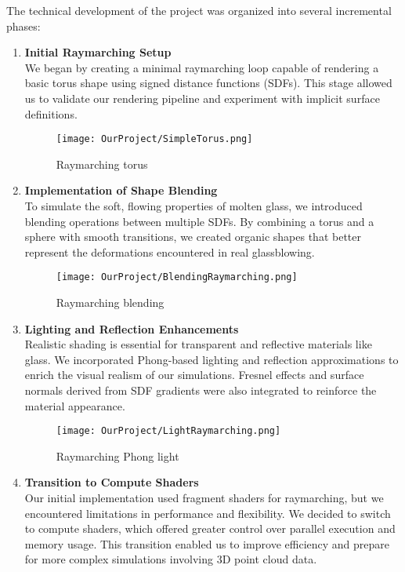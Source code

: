\documentclass{rapportcs}
\begin{document}
The technical development of the project was organized into several incremental phases:
\begin{enumerate}
  \item \textbf{Initial Raymarching Setup}\\
    We began by creating a minimal raymarching loop capable of rendering a basic torus shape using signed distance functions (SDFs). This stage allowed us to validate our rendering pipeline and experiment with implicit surface definitions.

    \begin{figure}[H]
    \centering
    \texttt{[image: OurProject/SimpleTorus.png]}
    \caption{Raymarching torus}
    \label{fig:label_image}
\end{figure}
\newpage
    
  \item \textbf{Implementation of Shape Blending}\\
    To simulate the soft, flowing properties of molten glass, we introduced blending operations between multiple SDFs. By combining a torus and a sphere with smooth transitions, we created organic shapes that better represent the deformations encountered in real glassblowing.

    \begin{figure}[H]
    \centering
    \texttt{[image: OurProject/BlendingRaymarching.png]}
    \caption{Raymarching blending}
    \label{fig:label_image}
\end{figure}

\newpage
    
  \item \textbf{Lighting and Reflection Enhancements}\\
    Realistic shading is essential for transparent and reflective materials like glass. We incorporated Phong-based lighting and reflection approximations to enrich the visual realism of our simulations. Fresnel effects and surface normals derived from SDF gradients were also integrated to reinforce the material appearance.

    \begin{figure}[H]
    \centering
    \texttt{[image: OurProject/LightRaymarching.png]}
    \caption{Raymarching Phong light}
    \label{fig:label_image}
\end{figure}

    \item \textbf{Transition to Compute Shaders}\\
    Our initial implementation used fragment shaders for raymarching, but we encountered limitations in performance and flexibility. We decided to switch to compute shaders, which offered greater control over parallel execution and memory usage. This transition enabled us to improve efficiency and prepare for more complex simulations involving 3D point cloud data.\\


\end{enumerate}
\end{document}

